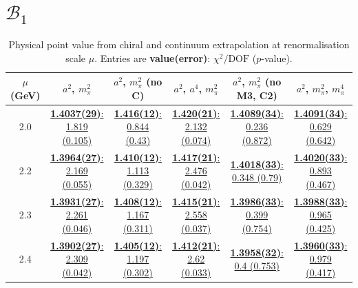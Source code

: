 \documentclass[12pt]{extarticle}
\begin{document}
\section{$\mathcal{B}_1$}
\begin{table}[h!]
\begin{center}
\begin{tabular}{|c|c|c|c|c|c|}
\hline
$\mu$ (GeV) & $a^2$, $m_\pi^2$& $a^2$, $m_\pi^2$ (no C)& $a^2$, $a^4$, $m_\pi^2$& $a^2$, $m_\pi^2$ (no M3, C2)& $a^2$, $m_\pi^2$, $m_\pi^4$\\
\hline
2.0& \hyperlink{VVpAA/NPR/a2m2_20.pdf.1}{\textbf{1.4037(29)}: 1.819 (0.105)} & \hyperlink{VVpAA/NPR/a2m2noC_20.pdf.1}{\textbf{1.416(12)}: 0.844 (0.43)} & \hyperlink{VVpAA/NPR/a2a4m2_20.pdf.1}{\textbf{1.420(21)}: 2.132 (0.074)} & \hyperlink{VVpAA/NPR/a2m2mcut_20.pdf.1}{\textbf{1.4089(34)}: 0.236 (0.872)} & \hyperlink{VVpAA/NPR/a2m2m4_20.pdf.1}{\textbf{1.4091(34)}: 0.629 (0.642)}\\
2.2& \hyperlink{VVpAA/NPR/a2m2_22.pdf.1}{\textbf{1.3964(27)}: 2.169 (0.055)} & \hyperlink{VVpAA/NPR/a2m2noC_22.pdf.1}{\textbf{1.410(12)}: 1.113 (0.329)} & \hyperlink{VVpAA/NPR/a2a4m2_22.pdf.1}{\textbf{1.417(21)}: 2.476 (0.042)} & \hyperlink{VVpAA/NPR/a2m2mcut_22.pdf.1}{\textbf{1.4018(33)}: 0.348 (0.79)} & \hyperlink{VVpAA/NPR/a2m2m4_22.pdf.1}{\textbf{1.4020(33)}: 0.893 (0.467)}\\
2.3& \hyperlink{VVpAA/NPR/a2m2_23.pdf.1}{\textbf{1.3931(27)}: 2.261 (0.046)} & \hyperlink{VVpAA/NPR/a2m2noC_23.pdf.1}{\textbf{1.408(12)}: 1.167 (0.311)} & \hyperlink{VVpAA/NPR/a2a4m2_23.pdf.1}{\textbf{1.415(21)}: 2.558 (0.037)} & \hyperlink{VVpAA/NPR/a2m2mcut_23.pdf.1}{\textbf{1.3986(33)}: 0.399 (0.754)} & \hyperlink{VVpAA/NPR/a2m2m4_23.pdf.1}{\textbf{1.3988(33)}: 0.965 (0.425)}\\
2.4& \hyperlink{VVpAA/NPR/a2m2_24.pdf.1}{\textbf{1.3902(27)}: 2.309 (0.042)} & \hyperlink{VVpAA/NPR/a2m2noC_24.pdf.1}{\textbf{1.405(12)}: 1.197 (0.302)} & \hyperlink{VVpAA/NPR/a2a4m2_24.pdf.1}{\textbf{1.412(21)}: 2.62 (0.033)} & \hyperlink{VVpAA/NPR/a2m2mcut_24.pdf.1}{\textbf{1.3958(32)}: 0.4 (0.753)} & \hyperlink{VVpAA/NPR/a2m2m4_24.pdf.1}{\textbf{1.3960(33)}: 0.979 (0.417)}\\
\hline
\end{tabular}
\caption{Physical point value from chiral and continuum extrapolation at renormalisation scale $\mu$. Entries are \textbf{value(error)}: $\chi^2/\text{DOF}$ ($p$-value).}
\end{center}
\end{table}
\end{document}
